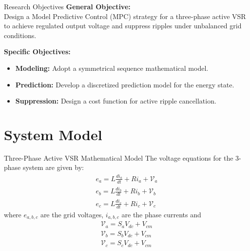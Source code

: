 \documentclass[aspectratio=169]{beamer}
\begin{document}
\begin{frame}{Research Objectives}
    \textbf{General Objective:}\\
    Design a Model Predictive Control (MPC) strategy for a three-phase active VSR to achieve regulated output voltage and suppress ripples under unbalanced grid conditions.
    
    \vspace{0.5cm}
    \textbf{Specific Objectives:}
    \begin{itemize}
        \item \textbf{Modeling:} Adopt a symmetrical sequence mathematical model.
        \item \textbf{Prediction:} Develop a discretized prediction model for the energy state.
        \item \textbf{Suppression:} Design a cost function for active ripple cancellation.
    \end{itemize}
\end{frame}

\section{System Model}

\begin{frame}{Three-Phase Active VSR Mathematical Model}
    The voltage equations for the 3-phase system are given by:
\begin{equation*}
    \begin{gathered}
        e_{a} = L \frac{di_a}{dt} + R i_a + \mathcal{V}_a\\
        e_{b} = L \frac{di_b}{dt} + R i_b + \mathcal{V}_b\\
        e_{c} = L \frac{di_c}{dt} + R i_c + \mathcal{V}_c
    \end{gathered}
\end{equation*}
where $e_{a,b,c}$ are the grid voltages, $i_{a,b,c}$ are the phase currents and 
\begin{equation*}
    \begin{gathered}
        \mathcal{V}_a = S_a V_{dc} + V_{cm}\\
        \mathcal{V}_b = S_b V_{dc} + V_{cm}\\
        \mathcal{V}_c = S_c V_{dc} + V_{cm}
    \end{gathered}
\end{equation*}
\end{frame}
\end{document}
